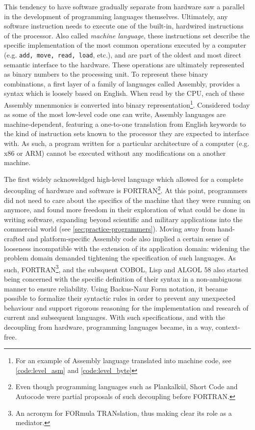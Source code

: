 This tendency to have software gradually separate from hardware saw a parallel in the development of programming languages themselves. Ultimately, any software instruction needs to execute one of the built-in, hardwired instructions of the processor. Also called \emph{machine language}, these instructions set describe the specific implementation of the most common operations executed by a computer (e.g. \lstinline{add, move, read, load}, etc.), and are part of the oldest and most direct semantic interface to the hardware. These operations are ultimately represented as binary numbers to the processing unit. To represent these binary combinations, a first layer of a family of languages called Assembly, provides a syntax which is loosely based on English. When read by the CPU, each of these Assembly mnenmonics is converted into binary representation\footnote{For an example of Assembly language translated into machine code, see \autoref{code:level_asm} and \autoref{code:level_byte}}. Considered today as some of the most low-level code one can write, Assembly languages are machine-dependent, featuring a one-to-one translation from English keywords to the kind of instruction sets known to the processor they are expected to interface with. As such, a program written for a particular architecture of a computer (e.g. x86 or ARM) cannot be executed without any modifications on a another machine.

The first widely acknoweldged high-level language which allowed for a complete decoupling of hardware and software is FORTRAN\footnote{Even though programming languages such as Plankalkül, Short Code and Autocode were partial proposals of such decoupling before FORTRAN.}. At this point, programmers did not need to care about the specifics of the machine that they were running on anymore, and found more freedom in their exploration of what could be done in writing software, expanding beyond scientific and military applications into the commercial world (see \autoref{sec:practice-programmers}). Moving away from hand-crafted and platform-specific Assembly code also implied a certain sense of looseness incompatible with the extension of its application domain: widening the problem domain demanded tightening the specification of such languages. As such, FORTRAN\footnote{An acronym for FORmula TRANslation, thus making clear its role as a mediator.}, and the subsquent COBOL, Lisp and ALGOL 58 also started being concerned with the specific definition of their syntax in a non-ambiguous manner to ensure reliability. Using Backus-Naur Form notation, it became possible to formalize their syntactic rules in order to prevent any unexpected behaviour and support rigorous reasoning for the implementation and research of current and subsequent languages. With such specifications, and with the decoupling from hardware, programming languages became, in a way, context-free.

